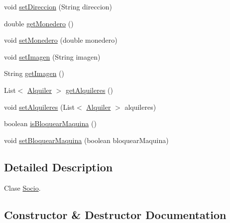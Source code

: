 \begin{DoxyCompactItemize}
\item 
void \mbox{\hyperlink{classes_1_1deusto_1_1client_1_1data_1_1_socio_ae1c6473781bee6e8b92bb66af901f7da}{set\+Direccion}} (String direccion)
\item 
double \mbox{\hyperlink{classes_1_1deusto_1_1client_1_1data_1_1_socio_a35b0219047172b5699a4e4b5177fb879}{get\+Monedero}} ()
\item 
void \mbox{\hyperlink{classes_1_1deusto_1_1client_1_1data_1_1_socio_a057a2d71d0942835f9741366783ac60f}{set\+Monedero}} (double monedero)
\item 
void \mbox{\hyperlink{classes_1_1deusto_1_1client_1_1data_1_1_socio_a45342e0c19a78646c1f2aa437471306b}{set\+Imagen}} (String imagen)
\item 
String \mbox{\hyperlink{classes_1_1deusto_1_1client_1_1data_1_1_socio_af011f597cc010b1c480ffbb586d98aa0}{get\+Imagen}} ()
\item 
List$<$ \mbox{\hyperlink{classes_1_1deusto_1_1client_1_1data_1_1_alquiler}{Alquiler}} $>$ \mbox{\hyperlink{classes_1_1deusto_1_1client_1_1data_1_1_socio_a50476fc68286b935fb935ddea81a0cc4}{get\+Alquileres}} ()
\item 
void \mbox{\hyperlink{classes_1_1deusto_1_1client_1_1data_1_1_socio_af8b991eb97c2e96eb292e214d037c3c3}{set\+Alquileres}} (List$<$ \mbox{\hyperlink{classes_1_1deusto_1_1client_1_1data_1_1_alquiler}{Alquiler}} $>$ alquileres)
\item 
boolean \mbox{\hyperlink{classes_1_1deusto_1_1client_1_1data_1_1_socio_adfbff36ef58c4373f4a31bc4e780c842}{is\+Bloquear\+Maquina}} ()
\item 
void \mbox{\hyperlink{classes_1_1deusto_1_1client_1_1data_1_1_socio_a413141651c6e0e8abf2238413387db7e}{set\+Bloquear\+Maquina}} (boolean bloquear\+Maquina)
\end{DoxyCompactItemize}


\subsection{Detailed Description}
Clase \mbox{\hyperlink{classes_1_1deusto_1_1client_1_1data_1_1_socio}{Socio}}. 

\subsection{Constructor \& Destructor Documentation}
\mbox{\label{classes_1_1deusto_1_1client_1_1data_1_1_socio_a2a27cfa518429e9d25899ddaf1ab7ea7}} 

